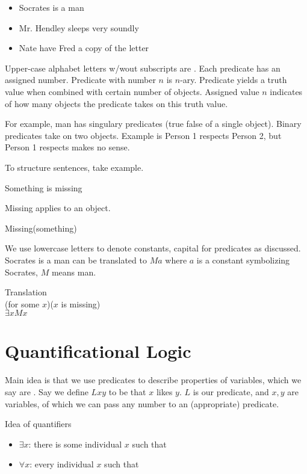 \begin{itemize}
    \item Socrates is a man
    \item Mr. Hendley sleeps very soundly
    \item Nate have Fred a copy of the letter
\end{itemize}

Upper-case alphabet letters w/wout subscripts are . Each predicate has an assigned number.
Predicate with number $n$ is $n$-ary. Predicate yields a truth value when combined with certain number of objects.
Assigned value $n$ indicates of how many objects the predicate takes on this truth value.

For example, man has singulary predicates (true false of a single object). Binary predicates take on two objects. Example is Person 1 respects Person 2, but Person 1 respects makes no sense.

To structure sentences, take example.

\begin{example}
    Something is missing
\end{example}

Missing applies to an object.

\begin{example}
    Missing(something)
\end{example}

We use lowercase letters to denote constants, capital for predicates as discussed.
Socrates is a man can be translated to $Ma$ where $a$ is a constant symbolizing Socrates, $M$ means man.

\begin{example} Translation\\
    (for some $x$)($x$ is missing)\\
    $\exists x M x$
\end{example}

\section{Quantificational Logic}

Main idea is that we use predicates to describe properties of variables, which we say are .
Say we define $Lxy$ to be that $x$ likes $y$. $L$ is our predicate, and $x,y$ are variables, of which we can pass any number to an (appropriate) predicate.

Idea of quantifiers
\begin{itemize}
    \item $\exists x$: there is some individual $x$ such that
    \item $\forall x$: every individual $x$ such that
\end{itemize}

